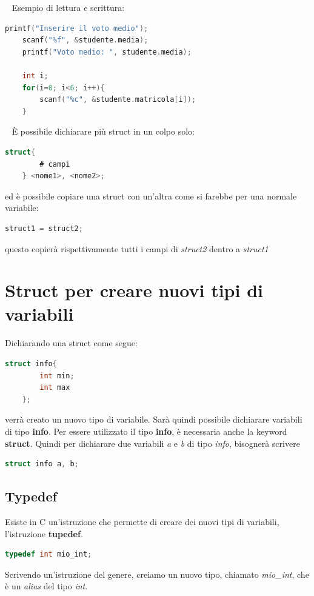 \documentclass[a4paper,11pt,oneside]{book}
\begin{document}
~\newline
Esempio di lettura e scrittura:
\begin{lstlisting}[language=C]
    printf("Inserire il voto medio");
    scanf("%f", &studente.media);
    printf("Voto medio: ", studente.media);

    int i;
    for(i=0; i<6; i++){
        scanf("%c", &studente.matricola[i]);
    }
\end{lstlisting}

~\newline
È possibile dichiarare più struct in un colpo solo:
\begin{lstlisting}[language=C]
    struct{
        # campi
    } <nome1>, <nome2>;
\end{lstlisting}
ed è possibile copiare una struct con un'altra come si farebbe per una normale variabile:
\begin{lstlisting}[language=C]
    struct1 = struct2;
\end{lstlisting}
questo copierà rispettivamente tutti i campi di \emph{struct2} dentro a \emph{struct1}

\section{Struct per creare nuovi tipi di variabili}
Dichiarando una struct come segue:
\begin{lstlisting}[language=C]
    struct info{
        int min;
        int max
    };
\end{lstlisting}
verrà creato un nuovo tipo di variabile. Sarà quindi possibile dichiarare variabili di tipo \textbf{info}.
Per essere utilizzato il tipo \textbf{info}, è necessaria anche la keyword \textbf{struct}. Quindi per 
dichiarare due variabili \emph{a} e \emph{b} di tipo \emph{info}, bisognerà scrivere
\begin{lstlisting}[language=C]
    struct info a, b;
\end{lstlisting}

\subsection{Typedef}
Esiste in C un'istruzione che permette di creare dei nuovi tipi di variabili, l'istruzione \textbf{tupedef}.
\begin{lstlisting}[language=C]
    typedef int mio_int; 
\end{lstlisting}
Scrivendo un'istruzione del genere, creiamo un nuovo tipo, chiamato \emph{mio\_int}, che è un \emph{alias} del tipo \emph{int}.
\end{document}
